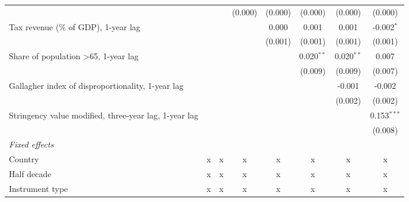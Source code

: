 \begin{tabular}{lccccccc}
                                                                     &                &               & (0.000)      & (0.000)      & (0.000)       & (0.000)       & (0.000)\\   
   Tax revenue (\% of GDP), 1-year lag                               &                &               &              & 0.000        & 0.001         & 0.001         & -0.002$^{*}$\\   
                                                                     &                &               &              & (0.001)      & (0.001)       & (0.001)       & (0.001)\\   
   Share of population >65, 1-year lag                               &                &               &              &              & 0.020$^{**}$  & 0.020$^{**}$  & 0.007\\   
                                                                     &                &               &              &              & (0.009)       & (0.009)       & (0.007)\\   
   Gallagher index of disproportionality, 1-year lag                 &                &               &              &              &               & -0.001        & -0.002\\   
                                                                     &                &               &              &              &               & (0.002)       & (0.002)\\   
   Stringency value modified, three-year lag, 1-year lag             &                &               &              &              &               &               & 0.153$^{***}$\\   
                                                                     &                &               &              &              &               &               & (0.008)\\   
   \emph{Fixed effects}\\
   Country                                                           & x              & x             & x            & x            & x             & x             & x\\  
   Half decade                                                       & x              & x             & x            & x            & x             & x             & x\\  
   Instrument type                                                   & x              & x             & x            & x            & x             & x             & x\\  

\end{tabular}
